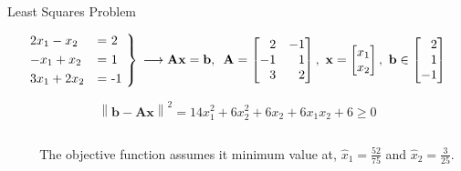 \documentclass[aspectratio=169]{beamer}
\begin{document}
\begin{frame}[t]{Least Squares Problem}
\vspace{-0.25cm}
\begin{small}
\[ 
    \begin{rcases*}
    2x_1 - x_2 & = 2 \\
    -x_1 + x_2 & = 1 \\
    3x_1 + 2x_2 & = -1
    \end{rcases*} \, \longrightarrow \mathbf{Ax} = \mathbf{b}, \,\,\, \mathbf{A} = \begin{bmatrix*}[r] 2 & -1\\ -1 & 1\\3 & 2\end{bmatrix*}, \,\, \mathbf{x} = \begin{bmatrix*}[r] x_1\\ x_2\end{bmatrix*} , \,\, \mathbf{b} \in \begin{bmatrix*}[r]2\\1\\-1\end{bmatrix*}
\]

\[
    \left\lVert \mathbf{b} - \mathbf{Ax}\right\rVert^2 = 14x_1^2 + 6x_2^2 + 6x_2 + 6x_1x_2 + 6 \geq 0
\]
\end{small}

\vspace{-0.25cm}

\begin{columns}
\begin{column}{0.6\textwidth}
\begin{center}
\end{center}
\end{column}

\begin{column}{0.4\textwidth}
The objective function assumes it minimum value at, $\hat{x}_1 = \frac{52}{75}$ and $\hat{x}_2 = \frac{3}{25}$.
\end{column}
\end{columns}
\end{frame}
\end{document}
